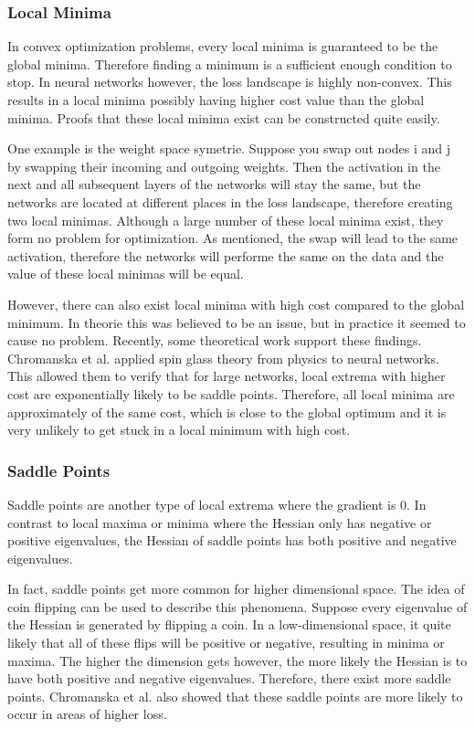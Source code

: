 \subsubsection{Local Minima}\label{sub:Local_minima}
In convex optimization problems, every local minima is guaranteed to be the
global minima. Therefore finding a minimum is a sufficient enough condition to
stop. In neural networks however, the loss landscape is highly non-convex. This
results in a local minima possibly having higher cost value than the global
minima. Proofs that these local minima exist can be constructed quite easily.

One example is the weight space symetrie. Suppose you swap out nodes i and j by
swapping their incoming and outgoing weights. Then the activation in the next
and all subsequent layers of the networks will stay the same, but the networks
are located at different places in the loss landscape, therefore creating two
local minimas. Although a large number of these local minima exist, they form no
problem for optimization. As mentioned, the swap will lead to the same
activation, therefore the networks will performe the same on the data and the
value of these local minimas will be equal.

However, there can also exist local minima with high cost compared to the global
minimum. In theorie this was believed to be an issue, but in practice it seemed
to cause no problem. Recently, some theoretical work support these findings.
Chromanska et al. \cite{choromanska2015loss} applied spin glass theory from
physics to neural networks. This allowed them to verify that for large networks,
local extrema with higher cost are exponentially likely to be saddle points.
Therefore, all local minima are approximately of the same cost, which is close
to the global optimum and it is very unlikely to get stuck in a local minimum
with high cost.

\subsubsection{Saddle Points}\label{prob:3}
Saddle points are another type of local extrema where the gradient is 0. In
contrast to local maxima or minima where the Hessian only has negative or
positive eigenvalues, the Hessian of saddle points has both positive and
negative eigenvalues.

In fact, saddle points get more common for higher dimensional space. The idea of
coin flipping can be used to describe this phenomena. Suppose every eigenvalue
of the Hessian is generated by flipping a coin. In a low-dimensional space, it
quite likely that all of these flips will be positive or negative, resulting in
minima or maxima. The higher the dimension gets however, the more likely the
Hessian is to have both positive and negative eigenvalues. Therefore, there
exist more saddle points. Chromanska et al. \cite{choromanska2015loss} also
showed that these saddle points are more likely to occur in areas of higher
loss.

